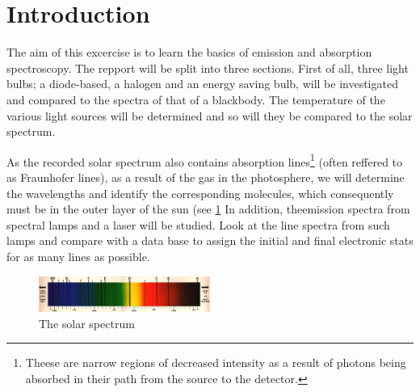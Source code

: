 \section{Introduction}

The aim of this excercise is to learn the basics of emission and absorption
spectroscopy. The repport will be split into three sections. First of all,
three light bulbs; a diode-based, a halogen and an energy saving bulb, will be
investigated and compared to the spectra of that of a blackbody. The
temperature of the various light sources will be determined and so will they be
compared to the solar spectrum. 

As the recorded solar spectrum also contains absorption lines\footnote{Theese
    are narrow regions of decreased intensity as a result of photons being
absorbed in their path from the source to the detector.} (often reffered to as
Fraunhofer lines), as a result of the gas in the photosphere, we will determine
the wavelengths and identify the corresponding molecules, which consequently
must be in the outer layer of the sun (see \cref{fig:frauenhofer} In addition, theemission spectra from
spectral lamps and a laser will be studied. 
Look at the line spectra from such lamps and compare with a data base to assign
the initial and final electronic stats for as many lines as possible. 

\begin{figure}[h!]
    \centering
    \includegraphics[width=0.5\textwidth]{solarspectrum}
    \caption{The solar spectrum}
    \label{fig:frauenhofer}
\end{figure}


